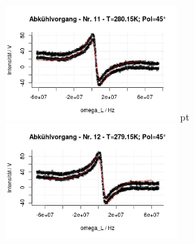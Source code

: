 \documentclass[12pt]{article}
\begin{document}
\begin{minipage}[h!]{\textwidth}
		\includegraphics[width=0.49\textwidth]{figures/cold45-11.png} pt
		\includegraphics[width=0.49\textwidth]{figures/cold45-12.png}\vskip -10pt
\end{minipage}
\end{document}
